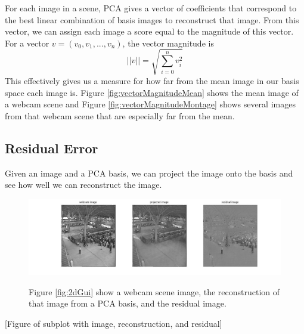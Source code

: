 For each image in a scene, PCA gives a vector of coefficients that correspond to the best linear combination of basis images to reconstruct that image.  From this vector, we can assign each image a score equal to the magnitude of this vector.  For a vector $v = (v_0, v_1, ..., v_n)$, the vector magnitude is $$||v||=\sqrt{\sum_{i=0}^nv_i^2}$$This effectively gives us a measure for how far from the mean image in our basis space each image is.  Figure \ref{fig:vectorMagnitudeMean} shows the mean image of a webcam scene and Figure \ref{fig:vectorMagnitudeMontage} shows several images from that webcam scene that are especially far from the mean.



\subsection{Residual Error}

Given an image and a PCA basis, we can project the image onto the basis and see how well we can reconstruct the image.

\begin{figure}
	\centering
		\includegraphics[width=1\textwidth]{figures/residualReconstruction.jpg}
	\label{fig:residualReconstruction}
	
		\caption[Residual Reconstruction.]{Figure \ref{fig:2dGui} show a webcam scene image, the reconstruction of that image from a PCA basis, and the residual image.}
\end{figure}

[Figure of subplot with image, reconstruction, and residual]

